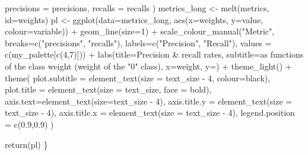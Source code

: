 \documentclass[
]{report}
\newenvironment{Shaded}{\begin{snugshade}}{\end{snugshade}}
\newcommand{\AttributeTok}[1]{\textcolor[rgb]{0.77,0.63,0.00}{#1}}
\newcommand{\DecValTok}[1]{\textcolor[rgb]{0.00,0.00,0.81}{#1}}
\newcommand{\FloatTok}[1]{\textcolor[rgb]{0.00,0.00,0.81}{#1}}
\newcommand{\FunctionTok}[1]{\textcolor[rgb]{0.00,0.00,0.00}{#1}}
\newcommand{\NormalTok}[1]{#1}
\newcommand{\OtherTok}[1]{\textcolor[rgb]{0.56,0.35,0.01}{#1}}
\newcommand{\SpecialCharTok}[1]{\textcolor[rgb]{0.00,0.00,0.00}{#1}}
\newcommand{\StringTok}[1]{\textcolor[rgb]{0.31,0.60,0.02}{#1}}
\begin{document}
\begin{Shaded}
\begin{Highlighting}[]
    \AttributeTok{precisions =}\NormalTok{ precisions,}
    \AttributeTok{recalls =}\NormalTok{ recalls}
\NormalTok{  )}
\NormalTok{  metrics\_long }\OtherTok{\textless{}{-}} \FunctionTok{melt}\NormalTok{(metrics, }\AttributeTok{id=}\StringTok{\textquotesingle{}weights\textquotesingle{}}\NormalTok{)}
\NormalTok{  pl }\OtherTok{\textless{}{-}} \FunctionTok{ggplot}\NormalTok{(}\AttributeTok{data=}\NormalTok{metrics\_long, }\FunctionTok{aes}\NormalTok{(}\AttributeTok{x=}\NormalTok{weights, }\AttributeTok{y=}\NormalTok{value, }\AttributeTok{colour=}\NormalTok{variable)) }\SpecialCharTok{+}
    \FunctionTok{geom\_line}\NormalTok{(}\AttributeTok{size=}\DecValTok{1}\NormalTok{) }\SpecialCharTok{+}
    \FunctionTok{scale\_colour\_manual}\NormalTok{(}\StringTok{"Metric"}\NormalTok{, }
                        \AttributeTok{breaks=}\FunctionTok{c}\NormalTok{(}\StringTok{"precisions"}\NormalTok{, }\StringTok{"recalls"}\NormalTok{),}
                        \AttributeTok{labels=}\FunctionTok{c}\NormalTok{(}\StringTok{"Precision"}\NormalTok{, }\StringTok{"Recall"}\NormalTok{),}
                        \AttributeTok{values =} \FunctionTok{c}\NormalTok{(my\_palette[}\FunctionTok{c}\NormalTok{(}\DecValTok{4}\NormalTok{,}\DecValTok{7}\NormalTok{)]))  }\SpecialCharTok{+}
    \FunctionTok{labs}\NormalTok{(}\AttributeTok{title=}\StringTok{\textquotesingle{}Precision \& recall rates\textquotesingle{}}\NormalTok{,}
         \AttributeTok{subtitle=}\StringTok{\textquotesingle{}as functions of the class weight (weight of the "0" class)\textquotesingle{}}\NormalTok{,}
         \AttributeTok{x=}\StringTok{\textquotesingle{}weight\textquotesingle{}}\NormalTok{, }\AttributeTok{y=}\StringTok{\textquotesingle{}\textquotesingle{}}\NormalTok{) }\SpecialCharTok{+}
     \FunctionTok{theme\_light}\NormalTok{() }\SpecialCharTok{+}
      \FunctionTok{theme}\NormalTok{(}
        \AttributeTok{plot.subtitle =} \FunctionTok{element\_text}\NormalTok{(}\AttributeTok{size =}\NormalTok{ text\_size }\SpecialCharTok{{-}} \DecValTok{4}\NormalTok{, }\AttributeTok{colour=}\StringTok{\textquotesingle{}black\textquotesingle{}}\NormalTok{),}
        \AttributeTok{plot.title =} \FunctionTok{element\_text}\NormalTok{(}\AttributeTok{size =}\NormalTok{ text\_size, }\AttributeTok{face =} \StringTok{\textquotesingle{}bold\textquotesingle{}}\NormalTok{),}
        \AttributeTok{axis.text=}\FunctionTok{element\_text}\NormalTok{(}\AttributeTok{size=}\NormalTok{text\_size }\SpecialCharTok{{-}} \DecValTok{4}\NormalTok{), }
        \AttributeTok{axis.title.y =} \FunctionTok{element\_text}\NormalTok{(}\AttributeTok{size =}\NormalTok{ text\_size }\SpecialCharTok{{-}} \DecValTok{4}\NormalTok{), }
        \AttributeTok{axis.title.x =} \FunctionTok{element\_text}\NormalTok{(}\AttributeTok{size =}\NormalTok{ text\_size }\SpecialCharTok{{-}} \DecValTok{4}\NormalTok{),}
        \AttributeTok{legend.position =} \FunctionTok{c}\NormalTok{(}\FloatTok{0.9}\NormalTok{,}\FloatTok{0.9}\NormalTok{)}
\NormalTok{      )}
    
  \FunctionTok{return}\NormalTok{(pl)}
\NormalTok{\}}
\end{Highlighting}
\end{Shaded}
\end{document}
